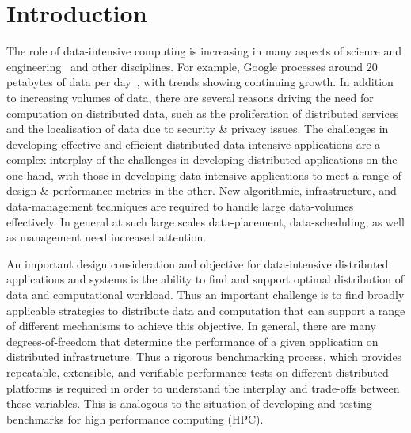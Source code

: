 \documentclass{rspublic}
\begin{document}
\vspace{-0.3cm}

\section{Introduction} 
The role of data-intensive computing is increasing in many aspects of
science and engineering~\citep{fourthparadigm} and other
disciplines. For example, Google processes around 20 petabytes of data
per day~\citep{google}, with trends showing continuing growth. In
addition to increasing volumes of data, there are several reasons
driving the need for computation on distributed data, such as the
proliferation of distributed services and the localisation of data due
to security \& privacy issues. The challenges in developing effective
and efficient distributed data-intensive applications are a complex
interplay of the challenges in developing distributed applications on
the one hand, with those in developing data-intensive applications to
meet a range of design \& performance metrics in the other. New
algorithmic, infrastructure, and data-management techniques are
required to handle large data-volumes effectively. In general at such
large scales data-placement, data-scheduling, as well as management
need increased attention.

An important design consideration and objective for data-intensive
distributed applications and systems is the ability to find and
support optimal distribution of data and computational workload. Thus
an important challenge is to find broadly applicable strategies to
distribute data and computation that can support a range of different
mechanisms to achieve this objective. In general, there are many
degrees-of-freedom that determine the performance of a given
application on distributed infrastructure. Thus a rigorous
benchmarking process, which provides repeatable, extensible, and
verifiable performance tests on different distributed platforms is
required in order to understand the interplay and trade-offs between
these variables. This is analogous to the situation of developing and
testing benchmarks for high performance computing (HPC). 
\end{document}
